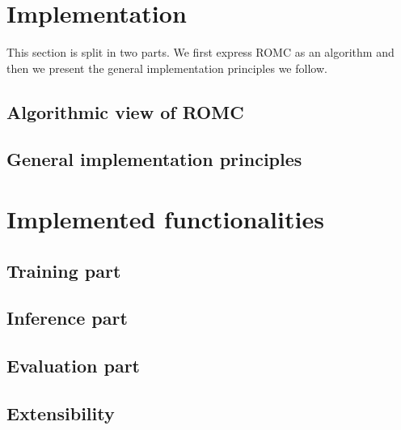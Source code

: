 \documentclass[article]{jss}
\begin{document}
\section{Implementation}
\label{sec:implementation}
This section is split in two parts. We first express ROMC as an
algorithm and then we present the general implementation principles we
follow.

\subsection{Algorithmic view of ROMC}


\subsection{General implementation principles}
\label{subsec:general_design}


\section{Implemented functionalities}


\subsection{Training part}
\label{subsec:training}


\subsection{Inference part}
\label{subsec:inference}


\subsection{Evaluation part}
\label{subsec:evaluation}


\subsection{Extensibility} %
\label{subsec:extensibility}


\end{document}
